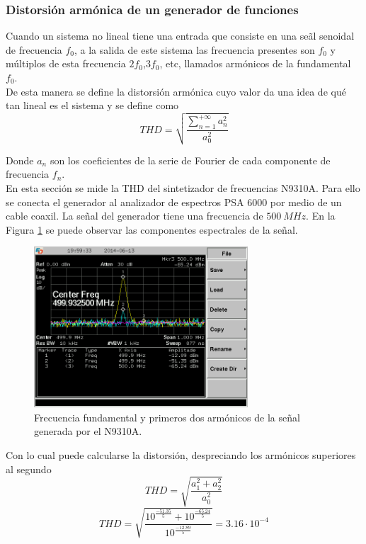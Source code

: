 \documentclass[a4paper,10pt]{article}
\begin{document}
		\subsubsection{Distorsi\'on arm\'onica de un generador de funciones}
		\indent Cuando un sistema no lineal tiene una entrada que consiste en 
		una se\~al senoidal de frecuencia $f_0$, a la salida de este sistema las
		frecuencia presentes son $f_0$ y m\'ultiplos de esta frecuencia 
		$2f_0$,$3f_0$, etc, llamados arm\'onicos de la fundamental $f_0$. \\
		\indent De esta manera se define la distorsi\'on arm\'onica cuyo valor 
		da una idea de qu\'e tan lineal es el sistema y se define como
		$$THD=\sqrt{\frac{\sum_{n=1}^{+\infty}a^2_n}{a^2_0}}$$
		
		\indent Donde $a_n$ son los coeficientes de la serie de Fourier de cada 
		componente de frecuencia $f_n$. \\
		\indent En esta secci\'on se mide la THD del sintetizador de frecuencias  
		N9310A. Para ello se conecta el generador al analizador de espectros PSA
		6000 por medio de un cable coaxil. La se\~nal del generador tiene una 
		frecuencia de $500~MHz$. En la Figura \ref{THD} se puede observar las 
		componentes espectrales de la se\~nal.
		
		\begin{figure}[!htb]
				\centering
				\includegraphics[width=8cm]
				{Imagenes/SCREN445.png}
				\caption{Frecuencia fundamental y primeros dos arm\'onicos de la
				se\~nal generada por el N9310A.}
				\label{THD} 
		\end{figure}
		
		\indent Con lo cual puede calcularse la distorsi\'on, despreciando los 
		arm\'onicos superiores al segundo
		$$THD=\sqrt{\frac{a^2_1+a^2_2}{a^2_0}}$$
		$$THD=\sqrt{\frac{10^{\frac{-51.35}{5}}+10^{\frac{-65.24}{5}}}{10^{
		\frac{-12.89}{5}}}}=3.16\cdot10^{-4}$$
		
		
\end{document}
